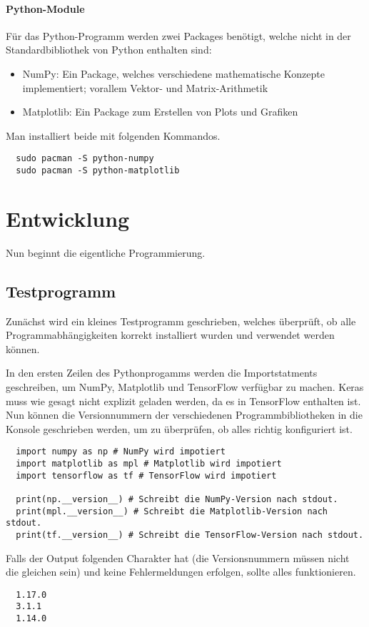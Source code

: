 \paragraph{Python-Module}

Für das Python-Programm werden zwei Packages benötigt, welche
nicht in der Standardbibliothek von Python enthalten sind:
\begin{itemize}
\item{NumPy: Ein Package, welches verschiedene mathematische Konzepte
    implementiert; vorallem Vektor- und Matrix-Arithmetik}
\item{Matplotlib: Ein Package zum Erstellen von Plots und Grafiken}
\end{itemize}

Man installiert beide mit folgenden Kommandos.
\begin{verbatim}
  sudo pacman -S python-numpy
  sudo pacman -S python-matplotlib
\end{verbatim}

\section{Entwicklung}
Nun beginnt die eigentliche Programmierung.

\subsection{Testprogramm}
Zunächst wird ein kleines Testprogramm geschrieben, welches überprüft, ob
alle Programmabhängigkeiten korrekt installiert wurden und verwendet werden können.

In den ersten Zeilen des Pythonprogamms werden die Importstatments
geschreiben, um NumPy, Matplotlib und TensorFlow verfügbar zu machen.
Keras muss wie gesagt nicht explizit geladen werden, da es in TensorFlow
enthalten ist.
Nun können die Versionnummern der verschiedenen Programmbibliotheken
in die Konsole geschrieben werden, um zu überprüfen, ob alles richtig konfiguriert ist.
\begin{verbatim}
  import numpy as np # NumPy wird impotiert
  import matplotlib as mpl # Matplotlib wird impotiert
  import tensorflow as tf # TensorFlow wird impotiert

  print(np.__version__) # Schreibt die NumPy-Version nach stdout.
  print(mpl.__version__) # Schreibt die Matplotlib-Version nach stdout.
  print(tf.__version__) # Schreibt die TensorFlow-Version nach stdout.
\end{verbatim}
Falls der Output folgenden Charakter hat (die Versionsnummern müssen nicht
die gleichen sein) und keine Fehlermeldungen erfolgen, sollte alles funktionieren.
\begin{verbatim}
  1.17.0
  3.1.1
  1.14.0
\end{verbatim}
\para{}

